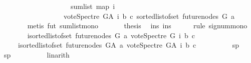 \begin{isabellebody}
\ \ \ \ \ \ \ \ \ \ \ \ \ \ \ \ \ \ {\isasymle}\ \ sum{\isacharunderscore}{\kern0pt}list\ {\isacharparenleft}{\kern0pt}map\ {\isacharparenleft}{\kern0pt}{\isasymlambda}i{\isachardot}{\kern0pt}\isanewline
\ \ \ \ \ \ \ \ \ \ \ \ \ \ \ \ \ \ {\isacharparenleft}{\kern0pt}vote{\isacharunderscore}{\kern0pt}Spectre\ G{\isacharunderscore}{\kern0pt}A\ i\ b\ c{\isacharparenright}{\kern0pt}{\isacharparenright}{\kern0pt}\ {\isacharparenleft}{\kern0pt}sorted{\isacharunderscore}{\kern0pt}list{\isacharunderscore}{\kern0pt}of{\isacharunderscore}{\kern0pt}set\ {\isacharparenleft}{\kern0pt}future{\isacharunderscore}{\kern0pt}nodes\ G\ a{\isacharparenright}{\kern0pt}{\isacharparenright}{\kern0pt}{\isacharparenright}{\kern0pt}{\isachardoublequoteclose}\isanewline
\ \ \ \ \ \ \isamarkupfalse%
\ {\isacharparenleft}{\kern0pt}metis\ fut\ sum{\isacharunderscore}{\kern0pt}list{\isacharunderscore}{\kern0pt}mono\ {\isacharparenright}{\kern0pt}\isanewline
\ \ \ \ \isamarkupfalse%
\ {\isacharquery}{\kern0pt}thesis\ \isamarkupfalse%
\ ins\ ins{}\isanewline
\ \ \ \ \isamarkupfalse%
\ {\isacharparenleft}{\kern0pt}rule\ signum{\isacharunderscore}{\kern0pt}mono{\isacharparenright}{\kern0pt}\isanewline
\ \ \ \ \ \ \isamarkupfalse%
\ {\isachardoublequoteopen}{\isacharparenleft}{\kern0pt}{\isasymSum}i{\isasymleftarrow}sorted{\isacharunderscore}{\kern0pt}list{\isacharunderscore}{\kern0pt}of{\isacharunderscore}{\kern0pt}set\ {\isacharparenleft}{\kern0pt}future{\isacharunderscore}{\kern0pt}nodes\ G\ a{\isacharparenright}{\kern0pt}{\isachardot}{\kern0pt}\ vote{\isacharunderscore}{\kern0pt}Spectre\ G\ i\ b\ c{\isacharparenright}{\kern0pt}\isanewline
\ \ \ \ {\isasymle}\ {\isacharparenleft}{\kern0pt}{\isasymSum}i{\isasymleftarrow}sorted{\isacharunderscore}{\kern0pt}list{\isacharunderscore}{\kern0pt}of{\isacharunderscore}{\kern0pt}set\ {\isacharparenleft}{\kern0pt}future{\isacharunderscore}{\kern0pt}nodes\ G{\isacharunderscore}{\kern0pt}A\ a{\isacharparenright}{\kern0pt}{\isachardot}{\kern0pt}\ vote{\isacharunderscore}{\kern0pt}Spectre\ G{\isacharunderscore}{\kern0pt}A\ i\ b\ c{\isacharparenright}{\kern0pt}{\isachardoublequoteclose}\isanewline
\ \ \ \ \ \ \ \ \isamarkupfalse%
\ sp{}\ \isamarkupfalse%
\ sp{}\isanewline
\ \ \ \ \ \ \ \ \isamarkupfalse%
\ linarith\ \isanewline
\ \ \ \ \isamarkupfalse%
\isanewline
\ \ \isamarkupfalse%
\isanewline
{}\isamarkupfalse%
%
\endisatagproof

\end{isabellebody}
